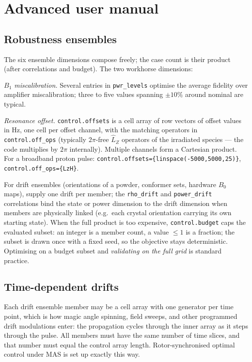 \documentclass[11pt,a4paper]{article}
\newcommand{\code}[1]{\texttt{#1}}
\newcommand{\op}[1]{\hat{#1}}
\begin{document}
\section{Advanced user manual}

\subsection{Robustness ensembles}

The six ensemble dimensions compose freely; the case count is their
product (after correlations and budget). The two workhorse dimensions:

\emph{$B_1$ miscalibration.} Several entries in \code{pwr\_levels}
optimise the average fidelity over amplifier miscalibration; three to
five values spanning $\pm10\%$ around nominal are typical.

\emph{Resonance offset.} \code{control.offsets} is a cell array of row
vectors of offset values in Hz, one cell per offset channel, with the
matching operators in \code{control.off\_ops} (typically $2\pi$-free
$\op{L}_Z$ operators of the irradiated species --- the code multiplies by
$2\pi$ internally). Multiple channels form a Cartesian product. For a
broadband proton pulse: \code{control.offsets=\{linspace(-5000,5000,25)\}},
\code{control.off\_ops=\{LzH\}}.

For drift ensembles (orientations of a powder, conformer sets, hardware
$B_0$ maps), supply one drift per member; the \code{rho\_drift} and
\code{power\_drift} correlations bind the state or power dimension to the
drift dimension when members are physically linked (e.g.\ each crystal
orientation carrying its own starting state). When the full product is
too expensive, \code{control.budget} caps the evaluated subset: an
integer is a member count, a value $\leq1$ is a fraction; the subset is
drawn once with a fixed seed, so the objective stays deterministic.
Optimising on a budget subset and \emph{validating on the full grid} is
standard practice.

\subsection{Time-dependent drifts}

Each drift ensemble member may be a cell array with one generator per
time point, which is how magic angle spinning, field sweeps, and other
programmed drift modulations enter: the propagation cycles through the
inner array as it steps through the pulse. All members must have the same
number of time slices, and that number must equal the control array
length. Rotor-synchronised optimal control under MAS is set up exactly
this way.
\end{document}
